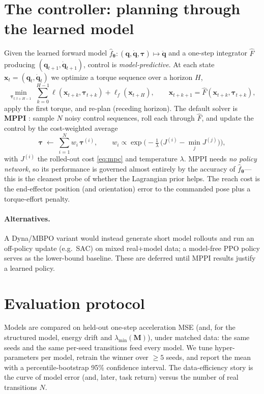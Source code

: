 \documentclass[11pt]{article}
\newcommand{\q}{\bm{q}}
\newcommand{\qd}{\dot{\bm{q}}}
\newcommand{\qdd}{\ddot{\bm{q}}}
\newcommand{\M}{\bm{M}}
\begin{document}
\section{The controller: planning through the learned model}
\label{sec:control}
Given the learned forward model $\hat f_{\bm\theta}:(\q,\qd,\bm\tau)\mapsto\qdd$
and a one-step integrator $\hat F$ producing $(\q_{t+1},\qd_{t+1})$, control is
\emph{model-predictive}. At each state $\bm{x}_t=(\q_t,\qd_t)$ we optimize a
torque sequence over a horizon $H$,
\begin{equation}
\min_{\bm\tau_{t:t+H-1}} \;
\sum_{k=0}^{H-1}\ell(\bm{x}_{t+k},\bm\tau_{t+k}) + \ell_f(\bm{x}_{t+H}),
\qquad
\bm{x}_{t+k+1}=\hat F(\bm{x}_{t+k},\bm\tau_{t+k}),
\label{eq:mpc}
\end{equation}
apply the first torque, and re-plan (receding horizon). The default solver is
\textbf{MPPI} \cite{williams2017mppi}: sample $N$ noisy control sequences, roll
each through $\hat F$, and update the control by the cost-weighted average
\begin{equation}
\bm\tau \;\leftarrow\; \sum_{i=1}^{N} w_i\,\bm\tau^{(i)},
\qquad
w_i \propto \exp\!\Big(-\tfrac1\lambda\,\big(J^{(i)}-\min_j J^{(j)}\big)\Big),
\label{eq:mppi}
\end{equation}
with $J^{(i)}$ the rolled-out cost \eqref{eq:mpc} and temperature $\lambda$.
MPPI needs \emph{no policy network}, so its performance is governed almost
entirely by the accuracy of $\hat f_{\bm\theta}$---this is the cleanest probe of
whether the Lagrangian prior helps. The reach cost is the end-effector position
(and orientation) error to the commanded pose plus a torque-effort penalty.

\paragraph{Alternatives.}
A Dyna/MBPO variant \cite{janner2019mbpo} would instead generate short model
rollouts and run an off-policy update (e.g.\ SAC) on mixed real+model data;
a model-free PPO policy serves as the lower-bound baseline. These are deferred
until MPPI results justify a learned policy.

\section{Evaluation protocol}
Models are compared on held-out one-step acceleration MSE (and, for the
structured model, energy drift and $\lambda_{\min}(\M)$), under matched data:
the same seeds and the same per-seed transitions feed every model. We tune
hyper-parameters per model, retrain the winner over $\ge 5$ seeds, and report the
mean with a percentile-bootstrap 95\% confidence interval. The data-efficiency
story is the curve of model error (and, later, task return) versus the number of
real transitions $N$.
\end{document}
